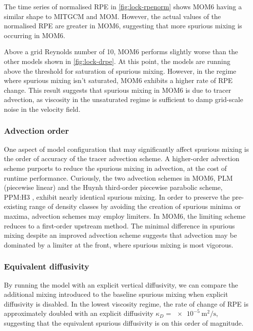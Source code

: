 The time series of normalised RPE in \cref{fig:lock-rpenorm} shows MOM6 having a similar shape to MITGCM and MOM. However, the actual values of the normalised RPE are greater in MOM6, suggesting that more spurious mixing is occurring in MOM6. 

Above a grid Reynolds number of 10, MOM6 performs slightly worse than the other models shown in \cref{fig:lock-drpe}. At this point, the models are running above the threshold for saturation of spurious mixing. However, in the regime where spurious mixing isn't saturated, MOM6 exhibits a higher rate of RPE change. This result suggests that spurious mixing in MOM6 is due to tracer advection, as viscosity in the unsaturated regime is sufficient to damp grid-scale noise in the velocity field.


\subsubsection{Advection order}
One aspect of model configuration that may significantly affect spurious mixing is the order of accuracy of the tracer advection scheme. A higher-order advection scheme purports to reduce the spurious mixing in advection, at the cost of runtime performance. Curiously, the two advection schemes in MOM6, PLM (piecewise linear) and the Huynh third-order piecewise parabolic scheme, PPM:H3 \citep{huynh97}, exhibit nearly identical spurious mixing. In order to preserve the pre-existing range of density classes by avoiding the creation of spurious minima or maxima, advection schemes may employ limiters. In MOM6, the limiting scheme reduces to a first-order upstream method. The minimal difference in spurious mixing despite an improved advection scheme suggests that advection may be dominated by a limiter at the front, where spurious mixing is most vigorous.


\subsubsection{Equivalent diffusivity}
By running the model with an explicit vertical diffusivity, we can compare the additional mixing introduced to the baseline spurious mixing when explicit diffusivity is disabled. In the lowest viscosity regime, the rate of change of RPE is approximately doubled with an explicit diffusivity $\kappa_D = \SI{e-5}{\square\metre\per\second}$, suggesting that the equivalent spurious diffusivity is on this order of magnitude.

